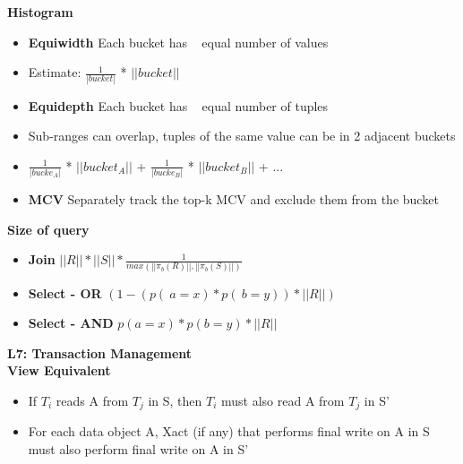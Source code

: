 \documentclass[10pt, landscape]{article}
\begin{document}
\begin{multicols}{4}
\textbf{Histogram} \\ 
\begin{itemize}
  \item \textbf{Equiwidth} Each bucket has ~ equal number of values
  \item Estimate: $\frac{1}{|bucket|}$ * $||bucket||$
  \item \textbf{Equidepth} Each bucket has ~ equal number of tuples
  \item Sub-ranges can overlap, tuples of the same value can be in 2 adjacent buckets
  \item $\frac{1}{|bucke_A|}$ * $||bucket_A||$ + $\frac{1}{|bucke_B|}$ * $||bucket_B||$ + ...
  \item \textbf{MCV} Separately track the top-k MCV and exclude them from the bucket
\end{itemize}

\textbf{Size of query}  \\
\begin{itemize}
  \item \textbf{Join} $||R||*||S||* \frac{1}{max(||\pi_b(R)||,||\pi_b(S)||)}$
  \item \textbf{Select - OR} $(1-(p(~a=x)*p(~b=y))*||R||)$
  \item \textbf{Select - AND} $p(a=x)*p(b=y)*||R||$
\end{itemize}

\textbf{\large{L7: Transaction Management}} \\
\textbf{View Equivalent} \\
\begin{itemize}
  \item If $T_i$ reads A from $T_j$ in S, then $T_i$ must also read A from $T_j$ in S'
  \item For each data object A, Xact (if any) that performs final write on A in S must also perform final write on A in S'
\end{itemize}


\end{multicols}
\end{document}
